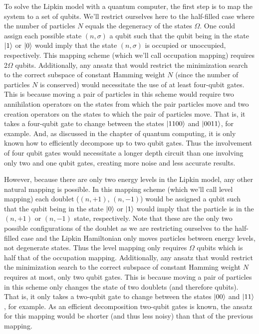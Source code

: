 \documentclass[10pt]{article}
\begin{document}
To solve the Lipkin model with a quantum computer, the first step is to map the system to a set of qubits. We'll restrict ourselves here to the half-filled case where the number of particles $N$ equals the degeneracy of the states $\Omega$. One could assign each possible state $(n,\sigma)$ a qubit such that the qubit being in the state $\ket{1}$ or $\ket{0}$ would imply that the state $(n,\sigma)$ is occupied or unoccupied, respectively. This mapping scheme (which we'll call occupation mapping) requires 2$\Omega$ qubits. Additionally, any ansatz that would restrict the minimization search to the correct subspace of constant Hamming weight $N$ (since the number of particles $N$ is conserved) would necessitate the use of at least four-qubit gates. This is because moving a pair of particles in this scheme would require two annihilation operators on the states from which the pair particles move and two creation operators on the states to which the pair of particles move. That is, it takes a four-qubit gate to change between the states $\ket{1100}$ and $\ket{0011}$, for example. And, as discussed in the chapter of quantum computing, it is only known how to efficiently decompose up to two qubit gates. Thus the involvement of four qubit gates would necessitate a longer depth circuit than one involving only two and one qubit gates, creating more noise and less accurate results.

However, because there are only two energy levels in the Lipkin model, any other natural mapping is possible. In this mapping scheme (which we'll call level mapping) each doublet ($(n,+1)$, $(n,-1)$) would be assigned a qubit such that the qubit being in the state $\ket{0}$ or $\ket{1}$ would imply that the particle is in the $(n,+1)$ or $(n,-1)$ state, respectively. Note that these are the only two possible configurations of the doublet as we are restricting ourselves to the half-filled case and the Lipkin Hamiltonian only moves particles between energy levels, not degenerate states. Thus the level mapping only requires $\Omega$ qubits which is half that of the occupation mapping. Additionally, any ansatz that would restrict the minimization search to the correct subspace of constant Hamming weight $N$ requires at most, only two qubit gates. This is because moving a pair of particles in this scheme only changes the state of two doublets (and therefore qubits). That is, it only takes a two-qubit gate to change between the states $\ket{00}$ and $\ket{11}$, for example. As an efficient decomposition two-qubit gates is known, the ansatz for this mapping would be shorter (and thus less noisy) than that of the previous mapping.
\end{document}
